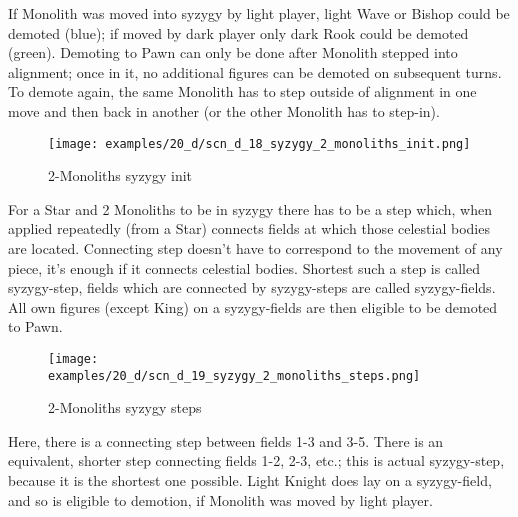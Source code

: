 If Monolith was moved into syzygy by light player, light Wave or Bishop could be demoted (blue); if moved by dark
player only dark Rook could be demoted (green). Demoting to Pawn can only be done after Monolith stepped into
alignment; once in it, no additional figures can be demoted on subsequent turns. To demote again, the same Monolith
has to step outside of alignment in one move and then back in another (or the other Monolith has to step-in).

\clearpage %

\noindent
\begin{figure}[!h]
\texttt{[image: examples/20\_d/scn\_d\_18\_syzygy\_2\_monoliths\_init.png]}
\caption{2-Monoliths syzygy init}
\label{fig:scn_d_18_syzygy_2_monoliths_init}
\end{figure}

For a Star and 2 Monoliths to be in syzygy there has to be a step which, when applied repeatedly (from a Star)
connects fields at which those celestial bodies are located. Connecting step doesn't have to correspond to the
movement of any piece, it's enough if it connects celestial bodies. Shortest such a step is called syzygy-step,
fields which are connected by syzygy-steps are called syzygy-fields. All own figures (except King) on a
syzygy-fields are then eligible to be demoted to Pawn.

\clearpage %

\noindent
\begin{figure}[!h]
\texttt{[image: examples/20\_d/scn\_d\_19\_syzygy\_2\_monoliths\_steps.png]}
\caption{2-Monoliths syzygy steps}
\label{fig:scn_d_19_syzygy_2_monoliths_steps}
\end{figure}

Here, there is a connecting step between fields 1-3 and 3-5. There is an equivalent, shorter step connecting fields
1-2, 2-3, etc.; this is actual syzygy-step, because it is the shortest one possible. Light Knight does lay on a
syzygy-field, and so is eligible to demotion, if Monolith was moved by light player.

\clearpage %

